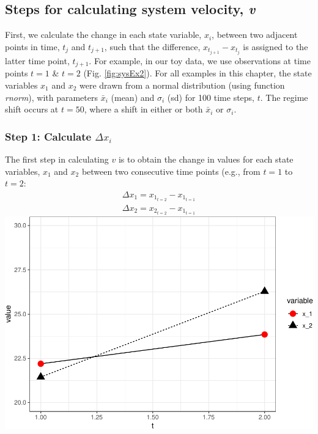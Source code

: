 \documentclass[12pt,twoside,openany]{reedthesis}
\begin{document}
\hypertarget{steps-for-calculating-system-velocity-v}{%
\subsection{\texorpdfstring{Steps for calculating system velocity, \emph{v}}{Steps for calculating system velocity, v}}\label{steps-for-calculating-system-velocity-v}}

First, we calculate the change in each state variable, \(x_i\), between two adjacent points in time, \(t_j\) and \(t_{j+1}\), such that the difference, \(x_{t_{j+1}} - x_{t_j}\) is assigned to the latter time point, \(t_{j+1}\). For example, in our toy data, we use observations at time points \(t = 1\) \& \(t=2\) (Fig. \ref{fig:sysEx2}). For all examples in this chapter, the state variables \(x_1\) and \(x_2\) were drawn from a normal distribution (using function \emph{rnorm}), with parameters \(\bar{x}_i\) (mean) and \(\sigma_i\) (sd) for 100 time steps, \(t\). The regime shift occurs at \(t=50\), where a shift in either or both \(\bar{x}_i\) or \(\sigma_i\).

\hypertarget{step-1-calculate-delta-x_i}{%
\subsubsection{\texorpdfstring{Step 1: Calculate \(\Delta x_i\)}{Step 1: Calculate \textbackslash Delta x\_i}}\label{step-1-calculate-delta-x_i}}

The first step in calculating \(v\) is to obtain the change in values for each state variables, \(x_1\) and \(x_2\) between two consecutive time points (e.g., from \(t=1\) to \(t=2\):
\begin{equation}
\begin{array}{rcr}
\Delta x_1 = x_{1_{t=2}} - x_{1_{t=1}} \\
\Delta x_2 = x_{2_{t=2}} - x_{1_{t=1}}
  \end{array}
\label{eq:diffX}
\end{equation}
\includegraphics{_myDissertation_files/figure-latex/sysEx2-1.pdf}
\end{document}
